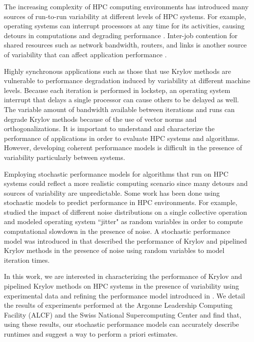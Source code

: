 \documentclass[sigconf]{acmart}
\begin{document}
The increasing complexity of HPC computing environments has introduced many sources of run-to-run variability at different levels of HPC systems. 
For example, operating systems can interrupt processors at any time for its activities, causing detours in computations and degrading performance \cite{hoefler2010characterizing, FerreiraBridgesBrightwell08}.
Inter-job contention for shared resources such as network bandwidth, routers, and links is another source of variability that can affect application performance \cite{parker2017early, chunduri2017run}. 

Highly synchronous applications such as those that use Krylov methods are vulnerable to performance degradation induced by variability at different machine levels. 
Because each iteration is performed in lockstep, an operating system interrupt that delays a single processor can cause others to be delayed as well.
The variable amount of bandwidth available between iterations and runs can degrade Krylov methods because of the use of vector norms and orthogonalizations.
It is important to understand and characterize the performance of applications in order to evaluate HPC systems and algorithms. 
However, developing coherent performance models is difficult in the presence of variability \cite{beckman2006influence, HoeflerLumsdaineRehm07} particularly between systems. 

Employing stochastic performance models for algorithms that run on HPC systems could reflect a more realistic computing scenario since many detours and sources of variability are unpredictable.
Some work has been done using stochastic models to predict performance in HPC environments. 
For example, \cite{agarwal2005impact} studied the impact of different noise distributions on a single collective operation and \cite{seelam2010extreme} modeled operating system 
 ``jitter" as random variables in order to compute computational slowdown in the 
  presence of noise.
A stochastic performance model was introduced in \cite{morgan2016krylov} that described the performance of Krylov and pipelined Krylov methods in the presence of noise using random variables to model iteration times. 

In this work, we are interested in characterizing the performance of Krylov and pipelined Krylov methods on HPC systems in the presence of variability using experimental data and refining the performance model introduced in \cite{morgan2016krylov}.
We detail the results of experiments performed at the Argonne Leadership Computing Facility (ALCF) and the Swiss National Supercomputing Center and find that, using these results, our stochastic performance models can accurately describe runtimes and suggest a way to perform a priori estimates.
\end{document}
